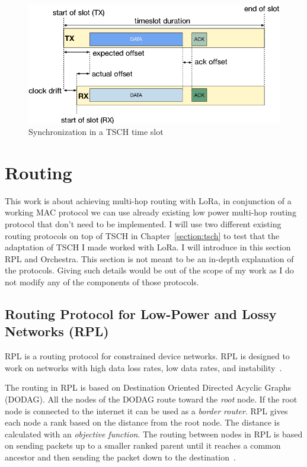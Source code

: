 \begin{figure}[H]
  \centering
  \includegraphics[width=\textwidth]{thesis.tex/chapters/context/fig/sync.png}
  \caption{Synchronization in a TSCH time slot\cite{TELESHERMETO201784}\label{fig:sync}}
\end{figure}

\section{Routing}

This work is about achieving multi-hop routing with LoRa, in conjunction of a
working MAC protocol we can use already existing low power multi-hop routing
protocol that don't need to be implemented.
I will use two different existing routing protocols on top of TSCH in
Chapter~\ref{section:tsch} to test that the adaptation of TSCH I made worked
with LoRa.
I will introduce in this section RPL and Orchestra.
This section is not meant to be an in-depth explanation of the protocols.
Giving such details would be out of the scope of my work as I do not modify any
of the components of those protocols.

\subsection{Routing Protocol for Low-Power and Lossy Networks (RPL)}

RPL is a routing protocol for constrained device networks.
RPL is designed to work on networks with high data loss rates, low data rates, and
instability~\cite{rfc6550}.

The routing in RPL is based on Destination Oriented Directed Acyclic Graphs (DODAG).
All the nodes of the DODAG route toward the \emph{root} node.
If the root node is connected to the internet it can be used as a \emph{border
router}.
RPL gives each node a rank based on the distance from the root node.
The distance is calculated with an \emph{objective function}.
The routing between nodes in RPL is based on sending packets up to a smaller
ranked parent until it reaches a common ancestor and then sending the packet down
to the destination~\cite{duquennoy2015}.

